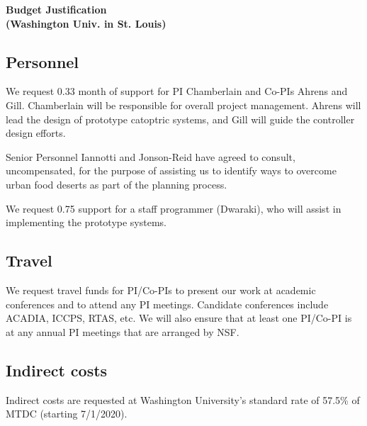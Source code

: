 \documentclass[11pt]{article}
\begin{document}
\pagestyle{empty}
\thispagestyle{empty}

\begin{center}
\textbf{\Large Budget Justification\\(Washington Univ. in St. Louis)}
\end{center}

\subsection*{Personnel}
We request 0.33 month of support for PI Chamberlain and Co-PIs
Ahrens and Gill.
Chamberlain will be responsible for overall project management. Ahrens will
lead the design of prototype catoptric systems, and Gill will guide the
controller design efforts.

\vspace{0.2in}
\noindent
Senior Personnel Iannotti and Jonson-Reid have agreed to consult,
uncompensated, for the purpose of assisting us to identify ways to overcome
urban food deserts as part of the planning process.

\vspace{0.2in}
\noindent
We request 0.75 support for a staff programmer (Dwaraki), who will assist
in implementing the prototype systems.

\subsection*{Travel}
We request travel funds for PI/Co-PIs
to present our work at academic 
conferences and to attend any PI meetings.
Candidate conferences include ACADIA, ICCPS, RTAS, etc.
We will also ensure that at least one PI/Co-PI is
at any annual PI meetings that are arranged by NSF. 

\subsection*{Indirect costs}
Indirect costs are requested at Washington University's standard rate of
57.5\% of MTDC (starting 7/1/2020).
\end{document}
